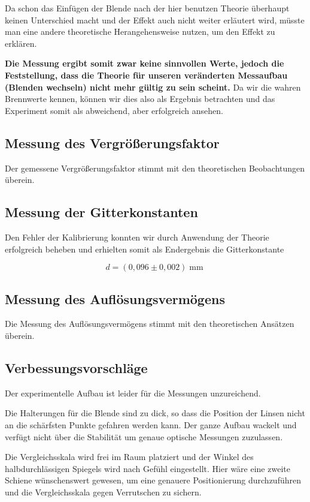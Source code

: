 \documentclass[a4paper,german,12pt,smallheadings]{scrartcl}
\begin{document}
Da schon das Einfügen der Blende nach der hier benutzen Theorie überhaupt
keinen Unterschied macht und der Effekt auch nicht weiter erläutert wird,
müsste man eine andere theoretische Herangehensweise nutzen, um den Effekt zu
erklären.

\textbf{Die Messung ergibt somit zwar keine sinnvollen Werte, jedoch die
Feststellung, dass die Theorie für unseren veränderten Messaufbau (Blenden
wechseln) nicht mehr gültig zu sein scheint.} Da wir die wahren Brennwerte
kennen, können wir dies also als Ergebnis betrachten und das Experiment somit
als abweichend, aber erfolgreich ansehen.

\subsection{Messung des Vergrößerungsfaktor}

Der gemessene Vergrößerungsfaktor stimmt mit den theoretischen Beobachtungen
überein.

\subsection{Messung der Gitterkonstanten}

Den Fehler der Kalibrierung konnten wir durch Anwendung der Theorie erfolgreich
beheben und erhielten somit als Endergebnis die Gitterkonstante

\begin{equation}
  d = (0{,}096\pm0{,}002) \operatorname{mm}
\end{equation}

\subsection{Messung des Auflösungsvermögens}

Die Messung des Auflösungsvermögens stimmt mit den theoretischen Ansätzen
überein.

\subsection{Verbessungsvorschläge}

Der experimentelle Aufbau ist leider für die Messungen unzureichend.

Die Halterungen für die Blende sind zu dick, so dass die Position der Linsen
nicht an die schärfsten Punkte gefahren werden kann. Der ganze Aufbau wackelt und
verfügt nicht über die Stabilität um genaue optische Messungen zuzulassen.

Die Vergleichsskala wird frei im Raum platziert und der Winkel des
halbdurchlässigen Spiegels wird nach Gefühl eingestellt. Hier wäre eine zweite
Schiene wünschenswert gewesen, um eine genauere Positionierung durchzuführen und
die Vergleichsskala gegen Verrutschen zu sichern.
\end{document}
